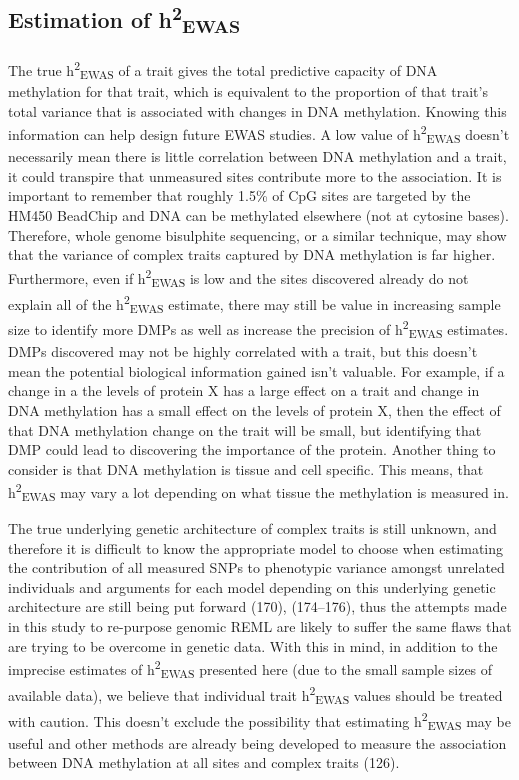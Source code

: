 \documentclass[11pt,oneside]{bristolthesis}
\begin{document}
\hypertarget{estimation-of-h2ewas}{%
\subsection{\texorpdfstring{Estimation of h\textsuperscript{2}\textsubscript{EWAS}}{Estimation of h2EWAS}}\label{estimation-of-h2ewas}}

The true h\textsuperscript{2}\textsubscript{EWAS} of a trait gives the total predictive capacity of DNA methylation for that trait, which is equivalent to the proportion of that trait's total variance that is associated with changes in DNA methylation. Knowing this information can help design future EWAS studies. A low value of h\textsuperscript{2}\textsubscript{EWAS} doesn't necessarily mean there is little correlation between DNA methylation and a trait, it could transpire that unmeasured sites contribute more to the association. It is important to remember that roughly 1.5\% of CpG sites are targeted by the HM450 BeadChip and DNA can be methylated elsewhere (not at cytosine bases). Therefore, whole genome bisulphite sequencing, or a similar technique, may show that the variance of complex traits captured by DNA methylation is far higher. Furthermore, even if h\textsuperscript{2}\textsubscript{EWAS} is low and the sites discovered already do not explain all of the h\textsuperscript{2}\textsubscript{EWAS} estimate, there may still be value in increasing sample size to identify more DMPs as well as increase the precision of h\textsuperscript{2}\textsubscript{EWAS} estimates. DMPs discovered may not be highly correlated with a trait, but this doesn't mean the potential biological information gained isn't valuable. For example, if a change in a the levels of protein X has a large effect on a trait and change in DNA methylation has a small effect on the levels of protein X, then the effect of that DNA methylation change on the trait will be small, but identifying that DMP could lead to discovering the importance of the protein. Another thing to consider is that DNA methylation is tissue and cell specific. This means, that h\textsuperscript{2}\textsubscript{EWAS} may vary a lot depending on what tissue the methylation is measured in.

The true underlying genetic architecture of complex traits is still unknown, and therefore it is difficult to know the appropriate model to choose when estimating the contribution of all measured SNPs to phenotypic variance amongst unrelated individuals and arguments for each model depending on this underlying genetic architecture are still being put forward (170), (174--176), thus the attempts made in this study to re-purpose genomic REML are likely to suffer the same flaws that are trying to be overcome in genetic data. With this in mind, in addition to the imprecise estimates of h\textsuperscript{2}\textsubscript{EWAS} presented here (due to the small sample sizes of available data), we believe that individual trait h\textsuperscript{2}\textsubscript{EWAS} values should be treated with caution. This doesn't exclude the possibility that estimating h\textsuperscript{2}\textsubscript{EWAS} may be useful and other methods are already being developed to measure the association between DNA methylation at all sites and complex traits (126).
\end{document}

